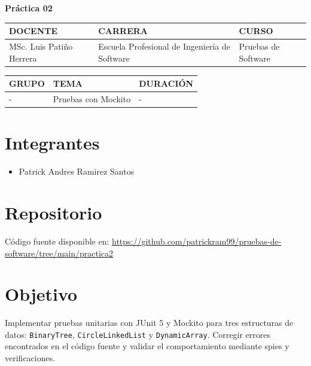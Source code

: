 \documentclass{article}
\newcommand{\csdocente}{MSc. Luis Pati\~no Herrera}
\newcommand{\cscurso}{Pruebas de Software}
\newcommand{\csescuela}{Escuela Profesional de Ingenier\'ia de Software}
\newcommand{\cspracnr}{02}
\newcommand{\cstema}{Pruebas con Mockito}
\begin{document}
\vspace*{10px}

\begin{center}
    \fontsize{17}{17} \textbf{ Pr\'actica \cspracnr}
\end{center}

\renewcommand{\arraystretch}{1.5}

\begin{table}[h]
\begin{tabular}{|x{4.7cm}|x{4.8cm}|x{4.8cm}|}
\hline
\textbf{DOCENTE} & \textbf{CARRERA} & \textbf{CURSO} \\
\hline
\csdocente & \csescuela & \cscurso \\
\hline
\end{tabular}
\end{table}

\begin{table}[h]
\begin{tabular}{|x{4.7cm}|x{4.8cm}|x{4.8cm}|}
\hline
\textbf{GRUPO} & \textbf{TEMA} & \textbf{DURACI\'ON} \\
\hline
- & \cstema & - \\
\hline
\end{tabular}
\end{table}

\renewcommand{\arraystretch}{1}

\section*{Integrantes}
\begin{itemize}
    \item Patrick Andres Ramirez Santos
\end{itemize}

\section*{Repositorio}
C\'odigo fuente disponible en: \url{https://github.com/patrickram99/pruebas-de-software/tree/main/practica2}

\tableofcontents
\newpage

\section{Objetivo}
Implementar pruebas unitarias con JUnit 5 y Mockito para tres estructuras de datos: \texttt{BinaryTree}, \texttt{CircleLinkedList} y \texttt{DynamicArray}. Corregir errores encontrados en el c\'odigo fuente y validar el comportamiento mediante spies y verificaciones.
\end{document}
